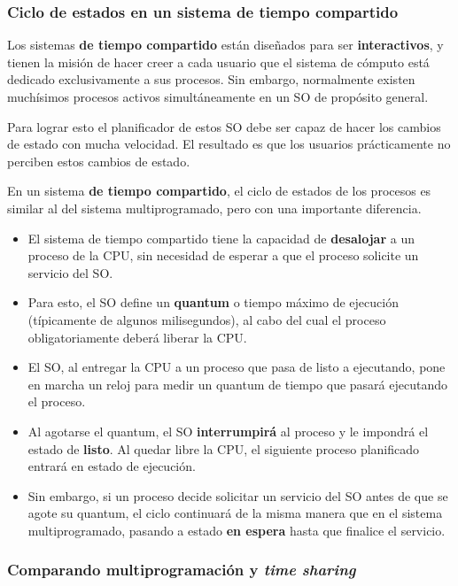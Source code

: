 \documentclass[spanish,a4paper,]{article}
\providecommand{\tightlist}{%
  \setlength{\itemsep}{0pt}\setlength{\parskip}{0pt}}
\begin{document}
\hypertarget{ciclo-de-estados-en-un-sistema-de-tiempo-compartido}{%
\subsubsection{Ciclo de estados en un sistema de tiempo
compartido}\label{ciclo-de-estados-en-un-sistema-de-tiempo-compartido}}

Los sistemas \textbf{de tiempo compartido} están diseñados para ser
\textbf{interactivos}, y tienen la misión de hacer creer a cada usuario
que el sistema de cómputo está dedicado exclusivamente a sus procesos.
Sin embargo, normalmente existen muchísimos procesos activos
simultáneamente en un SO de propósito general.

Para lograr esto el planificador de estos SO debe ser capaz de hacer los
cambios de estado con mucha velocidad. El resultado es que los usuarios
prácticamente no perciben estos cambios de estado.

En un sistema \textbf{de tiempo compartido}, el ciclo de estados de los
procesos es similar al del sistema multiprogramado, pero con una
importante diferencia.

\begin{itemize}
\tightlist
\item
  El sistema de tiempo compartido tiene la capacidad de
  \textbf{desalojar} a un proceso de la CPU, sin necesidad de esperar a
  que el proceso solicite un servicio del SO.
\item
  Para esto, el SO define un \textbf{quantum} o tiempo máximo de
  ejecución (típicamente de algunos milisegundos), al cabo del cual el
  proceso obligatoriamente deberá liberar la CPU.
\item
  El SO, al entregar la CPU a un proceso que pasa de listo a ejecutando,
  pone en marcha un reloj para medir un quantum de tiempo que pasará
  ejecutando el proceso.
\item
  Al agotarse el quantum, el SO \textbf{interrumpirá} al proceso y le
  impondrá el estado de \textbf{listo}. Al quedar libre la CPU, el
  siguiente proceso planificado entrará en estado de ejecución.
\item
  Sin embargo, si un proceso decide solicitar un servicio del SO antes
  de que se agote su quantum, el ciclo continuará de la misma manera que
  en el sistema multiprogramado, pasando a estado \textbf{en espera}
  hasta que finalice el servicio.
\end{itemize}

\hypertarget{comparando-multiprogramaciuxf3n-y-time-sharing}{%
\subsubsection{\texorpdfstring{Comparando multiprogramación y \emph{time
sharing}}{Comparando multiprogramación y time sharing}}\label{comparando-multiprogramaciuxf3n-y-time-sharing}}
\end{document}
